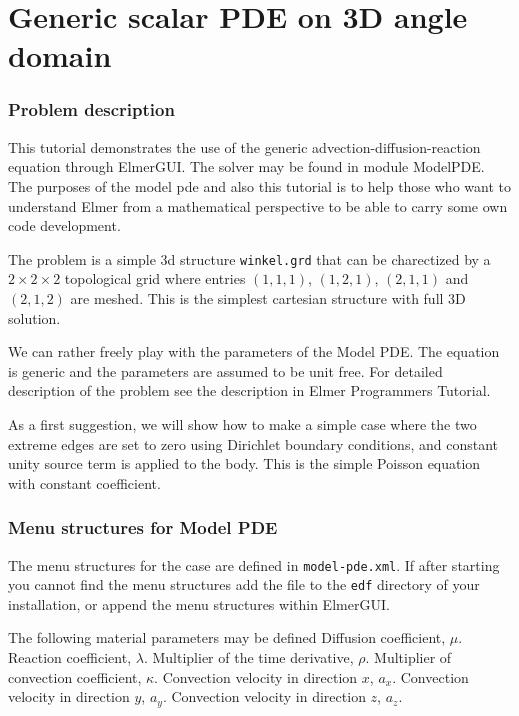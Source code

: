 \chapter{Generic scalar PDE on 3D angle domain}



\subsection*{Problem description}

This tutorial demonstrates the use of the generic advection-diffusion-reaction 
equation through ElmerGUI. The solver may be found in module ModelPDE. 
The purposes of the model pde and also this tutorial is to help 
those who want to understand Elmer from a mathematical perspective to be
able to carry some own code development. 

The problem is a simple 3d structure \texttt{winkel.grd} that can be charectized by a 
$2\times 2\times 2$ topological grid where entries $(1,1,1)$, $(1,2,1)$, $(2,1,1)$ and
$(2,1,2)$ are meshed. This is the simplest cartesian structure with full 3D 
solution. 

We can rather freely play with the parameters of the Model PDE. The equation is 
generic and the parameters are assumed to be unit free. 
For detailed description of the problem see the description in Elmer Programmers Tutorial.

As a first suggestion, we will show how to make a simple case where the two extreme edges 
are set to zero using Dirichlet boundary conditions, and constant unity source term is 
applied to the body. This is the simple Poisson equation with constant coefficient. 

\subsection*{Menu structures for Model PDE}

The menu structures for the case are defined in \texttt{model-pde.xml}. If after starting
you cannot find the menu structures add the file to the \texttt{edf} directory of your installation,
or append the menu structures within ElmerGUI. 

\noindent 
The following material parameters may be defined
\sifbegin
{}
Diffusion coefficient, $\mu$.
Reaction coefficient, $\lambda$.
Multiplier of the time derivative, $\rho$.
Multiplier of convection coefficient, $\kappa$.
Convection velocity in direction $x$, $a_x$.
Convection velocity in direction $y$, $a_y$.
Convection velocity in direction $z$, $a_z$.
\sifend

